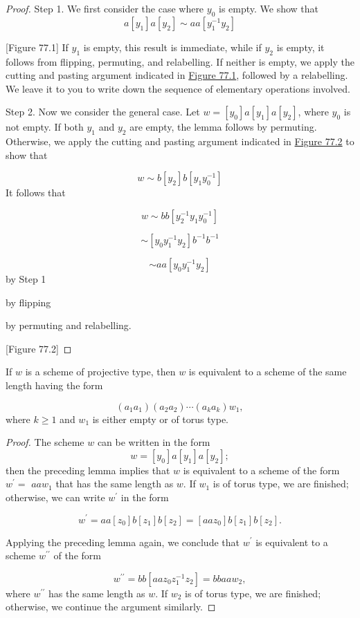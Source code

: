 \begin{proof}
	Step 1. We first consider the case where \(y_{0}\) is empty. We show that
\[
a[ y_{1}] a[ y_{2}] \sim {aa}[ {y_1^{-1}y_{2}}]
\]

[Figure 77.1]
If \(y_{1}\) is empty, this result is immediate, while if \(y_{2}\) is empty, it follows from flipping, permuting, and relabelling. If neither is empty, we apply the cutting and pasting argument indicated in \hyperref[fig:77.1]{Figure 77.1}, followed by a relabelling. We leave it to you to write down the sequence of elementary operations involved.

Step 2. Now we consider the general case. Let \(w = [ y_{0}] a[ y_{1}] a[ y_{2}]\), where \(y_{0}\) is not empty. If both \(y_{1}\) and \(y_{2}\) are empty, the lemma follows by permuting. Otherwise, we apply the cutting and pasting argument indicated in \hyperref[fig:77.2]{Figure 77.2} to show that

\[
w \sim b[ y_{2}] b[ {y_{1}y_0^{-1}}]
\]
It follows that

\[
w \sim {bb}[ {y_2^{-1}y_{1}y_0^{-1}}]
\]

\[
\sim [ {y_{0}y_1^{-1}y_{2}}] b^{-1}b^{-1}
\]

\[
\sim {aa}[ {y_{0}y_1^{-1}y_{2}}]
\]
by Step 1

by flipping

by permuting and relabelling.

[Figure 77.2]
\end{proof}
\begin{corollary}
\label{cor:\thetheorem}
	If \(w\) is a scheme of projective type, then \(w\) is equivalent to a scheme of the same length having the form

\[
( {a_{1}a_{1}}) ( {a_{2}a_{2}}) \cdots ( {a_{k}a_{k}}) w_{1},
\]
where \(k \geq 1\) and \(w_{1}\) is either empty or of torus type.
\end{corollary}

\begin{proof}
	The scheme \(w\) can be written in the form
\[
w = [ y_{0}] a[ y_{1}] a[ y_{2}] ;
\]
then the preceding lemma implies that \(w\) is equivalent to a scheme of the form \(w^{\prime } =\) \({aa}w_{1}\) that has the same length as \(w\). If \(w_{1}\) is of torus type, we are finished; otherwise, we can write \(w^{\prime }\) in the form

\[
w^{\prime } = {aa}[ z_{0}] b[ z_{1}] b[ z_{2}] = [ {{aa}z_{0}}] b[ z_{1}] b[ z_{2}] .
\]

Applying the preceding lemma again, we conclude that \(w^{\prime }\) is equivalent to a scheme \(w^{\prime \prime }\) of the form

\[
w^{\prime \prime } = {bb}[ {{aa}z_{0}z_1^{-1}z_{2}}] = {bbaa}w_{2},
\]
where \(w^{\prime \prime }\) has the same length as \(w\). If \(w_{2}\) is of torus type, we are finished; otherwise, we continue the argument similarly.
\end{proof}

